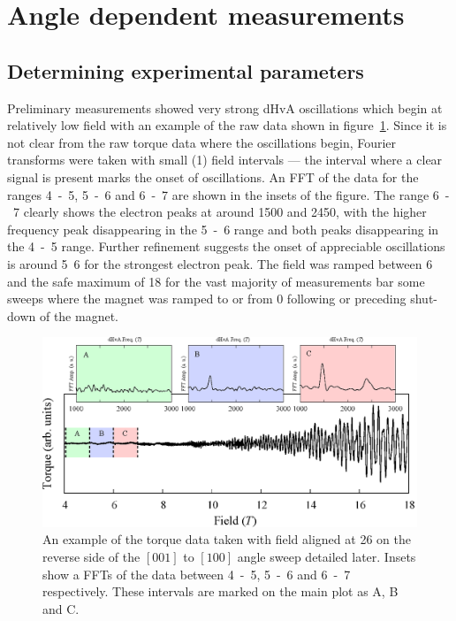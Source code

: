 
\section{Angle dependent measurements}
    \label{Sec:ResD:AngleDependentMeasurements}

\subsection{Determining experimental parameters}

Preliminary measurements showed very strong \ac{dHvA} oscillations which begin at relatively low field with an example of the raw data shown in figure~\ref{Fig:ResD:RawOscillations}. Since it is not clear from the raw torque data where the oscillations begin, Fourier transforms were taken with small (\unit{1}{\tesla}) field intervals --- the interval where a clear signal is present marks the onset of oscillations. An \ac{FFT} of the data for the ranges \unit{4-5}{\tesla}, \unit{5-6}{\tesla} and \unit{6-7}{\tesla} are shown in the insets of the figure. The range \unit{6-7}{\tesla} clearly shows the electron peaks at around \unit{1500}{\tesla} and \unit{2450}{\tesla}, with the higher frequency peak disappearing in the \unit{5-6}{\tesla} range and both peaks disappearing in the \unit{4-5}{\tesla} range. Further refinement suggests the onset of appreciable oscillations is around \unit{5.6}{\tesla} for the strongest electron peak. The field was ramped between \unit{6}{\tesla} and the safe maximum of \unit{18}{\tesla} for the vast majority of measurements bar some sweeps where the magnet was ramped to or from \unit{0}{\tesla} following or preceding shut-down of the magnet.

\begin{figure}[htbp]
    \begin{center}
        \includegraphics[scale=0.7]{Chapter-dHvABaFe2P2/Figures/AngleDepMeasurements/RawOscillations/RawOscillations}
        \caption{An example of the torque data taken with field aligned at \unit{26}{\degree} on the reverse side of the $[001]$ to $[100]$ angle sweep detailed later. Insets show a \acp{FFT} of the data between \unit{4-5}{\tesla}, \unit{5-6}{\tesla} and \unit{6-7}{\tesla} respectively. These intervals are marked on the main plot as A, B and C.}
        \label{Fig:ResD:RawOscillations}
    \end{center}
\end{figure}

